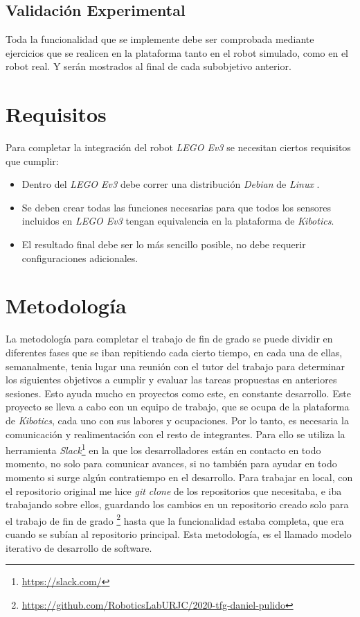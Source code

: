 \subsection{Validación Experimental}
Toda la funcionalidad que se implemente debe ser comprobada mediante ejercicios que se realicen en la plataforma tanto en el robot simulado, como en el robot real. Y serán mostrados al final de cada subobjetivo anterior.
    

\section{Requisitos}
\label{sec:requisitos}
Para completar la integración del robot \textit{LEGO Ev3} se necesitan ciertos requisitos que cumplir:
\begin{itemize}
    \item Dentro del \textit{LEGO Ev3} debe correr una distribución \textit{Debian} de \textit{Linux} .
\item Se deben crear todas las funciones necesarias para que todos los sensores incluidos en \textit{LEGO Ev3} tengan equivalencia en la plataforma de \textit{Kibotics}.
    \item El resultado final debe ser lo más sencillo posible, no debe requerir configuraciones adicionales. 
\end{itemize}    

\section{Metodología}
\label{sec:metodologia}

La metodología para completar el trabajo de fin de grado se puede dividir en diferentes fases que se iban repitiendo cada cierto tiempo, en cada una de ellas, semanalmente, tenia lugar una reunión con el tutor del trabajo para determinar los siguientes objetivos a cumplir y evaluar las tareas propuestas en anteriores sesiones. Esto ayuda mucho en proyectos como este, en constante desarrollo.\newline
Este proyecto se lleva a cabo con un equipo de trabajo, que se ocupa de la plataforma de \textit{Kibotics}, cada uno con sus labores y ocupaciones. Por lo tanto, es necesaria la comunicación y realimentación con el resto de integrantes. Para ello se utiliza la herramienta \textit{Slack}\footnote{\url{https://slack.com/}} en la que los desarrolladores están en contacto en todo momento, no solo para comunicar avances, si no también para ayudar en todo momento si surge algún contratiempo en el desarrollo.\newline
Para trabajar en local, con el repositorio original me hice \textit{git clone} de los repositorios que necesitaba, e iba trabajando sobre ellos, guardando los cambios en un repositorio creado solo para el trabajo de fin de grado \footnote{\url{https://github.com/RoboticsLabURJC/2020-tfg-daniel-pulido}} hasta que la funcionalidad estaba completa, que era cuando se subían al repositorio principal. Esta metodología, es el llamado modelo iterativo de desarrollo de software.



